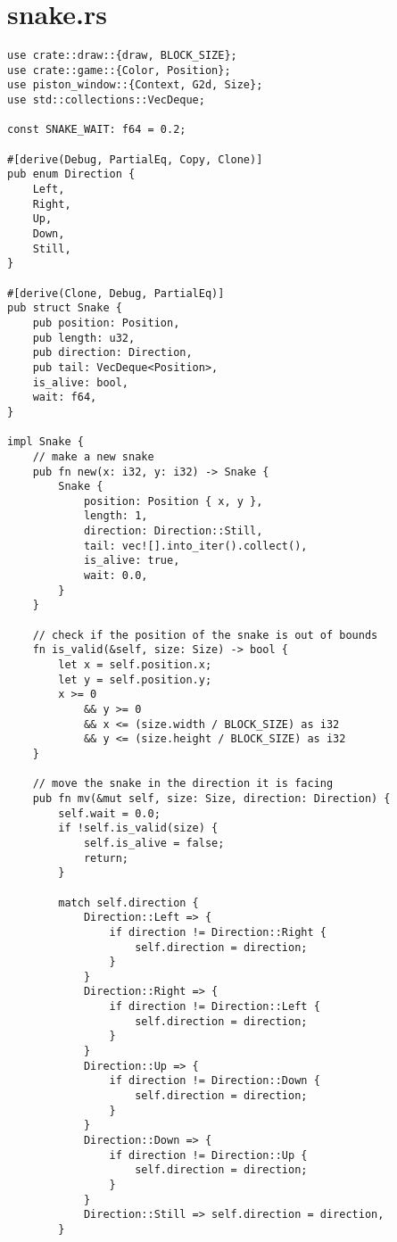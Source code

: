 \documentclass{article}
\begin{document}
\section{snake.rs}
\begin{verbatim}
use crate::draw::{draw, BLOCK_SIZE};
use crate::game::{Color, Position};
use piston_window::{Context, G2d, Size};
use std::collections::VecDeque;

const SNAKE_WAIT: f64 = 0.2;

#[derive(Debug, PartialEq, Copy, Clone)]
pub enum Direction {
    Left,
    Right,
    Up,
    Down,
    Still,
}

#[derive(Clone, Debug, PartialEq)]
pub struct Snake {
    pub position: Position,
    pub length: u32,
    pub direction: Direction,
    pub tail: VecDeque<Position>,
    is_alive: bool,
    wait: f64,
}

impl Snake {
    // make a new snake
    pub fn new(x: i32, y: i32) -> Snake {
        Snake {
            position: Position { x, y },
            length: 1,
            direction: Direction::Still,
            tail: vec![].into_iter().collect(),
            is_alive: true,
            wait: 0.0,
        }
    }

    // check if the position of the snake is out of bounds
    fn is_valid(&self, size: Size) -> bool {
        let x = self.position.x;
        let y = self.position.y;
        x >= 0
            && y >= 0
            && x <= (size.width / BLOCK_SIZE) as i32
            && y <= (size.height / BLOCK_SIZE) as i32
    }

    // move the snake in the direction it is facing
    pub fn mv(&mut self, size: Size, direction: Direction) {
        self.wait = 0.0;
        if !self.is_valid(size) {
            self.is_alive = false;
            return;
        }

        match self.direction {
            Direction::Left => {
                if direction != Direction::Right {
                    self.direction = direction;
                }
            }
            Direction::Right => {
                if direction != Direction::Left {
                    self.direction = direction;
                }
            }
            Direction::Up => {
                if direction != Direction::Down {
                    self.direction = direction;
                }
            }
            Direction::Down => {
                if direction != Direction::Up {
                    self.direction = direction;
                }
            }
            Direction::Still => self.direction = direction,
        }


\end{verbatim}
\end{document}
